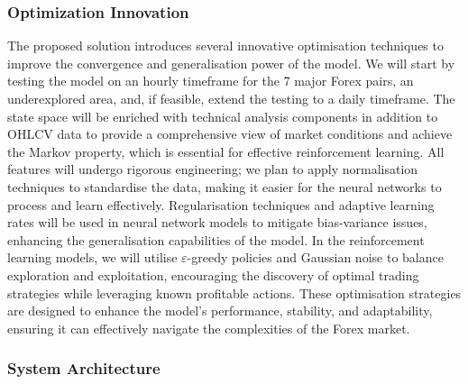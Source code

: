 \subsubsection{Optimization Innovation}

The proposed solution introduces several innovative optimisation techniques to improve the convergence and generalisation power of the model. We will start by testing the model on an hourly timeframe for the 7 major Forex pairs, an underexplored area, and, if feasible, extend the testing to a daily timeframe. The state space will be enriched with technical analysis components in addition to OHLCV data to provide a comprehensive view of market conditions and achieve the Markov property, which is essential for effective reinforcement learning. All features will undergo rigorous engineering; we plan to apply normalisation techniques to standardise the data, making it easier for the neural networks to process and learn effectively. Regularisation techniques and adaptive learning rates will be used in neural network models to mitigate bias-variance issues, enhancing the generalisation capabilities of the model. In the reinforcement learning models, we will utilise \(\varepsilon\)-greedy policies and Gaussian noise to balance exploration and exploitation, encouraging the discovery of optimal trading strategies while leveraging known profitable actions. These optimisation strategies are designed to enhance the model's performance, stability, and adaptability, ensuring it can effectively navigate the complexities of the Forex market.

\subsubsection{System Architecture}

